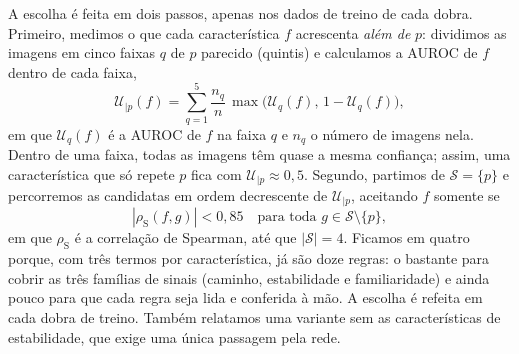 \documentclass[conference,a4paper]{IEEEtran}
\begin{document}
A escolha é feita em dois passos, apenas nos dados de treino de cada dobra. Primeiro, medimos o que
cada característica $f$ acrescenta \emph{além de} $p$: dividimos as imagens em cinco faixas $q$ de $p$ parecido
(quintis) e calculamos a AUROC de $f$ dentro de cada faixa,
\begin{equation}
  \mathcal{U}_{|p}(f) = \sum_{q=1}^{5} \frac{n_q}{n}\,\max\!\big(\mathcal{U}_q(f),\, 1 - \mathcal{U}_q(f)\big),
  \label{eq:auroc_alem}
\end{equation}
em que $\mathcal{U}_q(f)$ é a AUROC de $f$ na faixa $q$ e $n_q$ o número de imagens nela. Dentro de uma faixa, todas
as imagens têm quase a mesma confiança; assim, uma característica que só repete $p$ fica com $\mathcal{U}_{|p} \approx 0{,}5$.
Segundo, partimos de $\mathcal{S} = \{p\}$ e percorremos as candidatas em ordem decrescente de
$\mathcal{U}_{|p}$, aceitando $f$ somente se
\begin{equation}
  |\rho_{\mathrm{S}}(f, g)| < 0{,}85 \quad \text{para toda } g \in \mathcal{S} \setminus \{p\},
  \label{eq:selecao}
\end{equation}
em que $\rho_{\mathrm{S}}$ é a correlação de Spearman, até que $|\mathcal{S}| = 4$. Ficamos em quatro porque,
com três termos por característica, já são doze regras: o bastante para cobrir as três famílias de sinais
(caminho, estabilidade e familiaridade) e ainda pouco para que cada regra seja lida e conferida à mão.
A escolha é refeita em cada dobra de treino. Também relatamos uma variante sem as características de estabilidade,
que exige uma única passagem pela rede.
\end{document}
